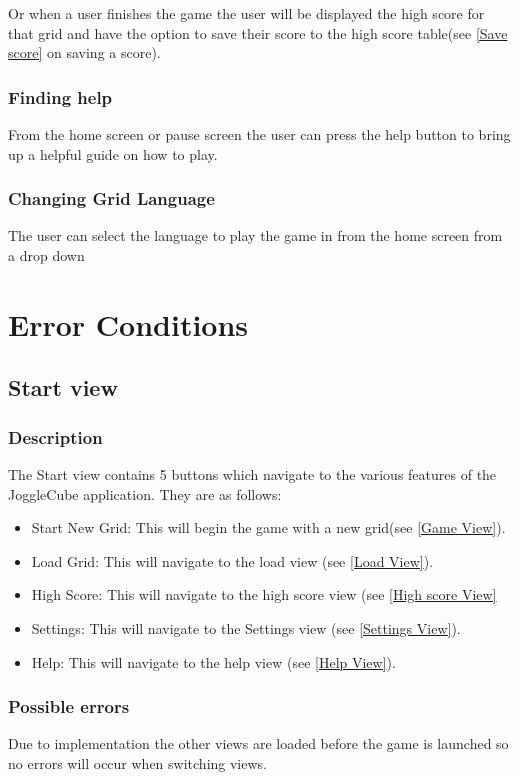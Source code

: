 \documentclass{project}
\begin{document}
		Or when a user finishes the game the user will be displayed the high score for that grid and have the option to save their score to the high score table(see \ref{Save score}  on saving a score).
		\subsubsection{Finding help} \label{Finding help}
			From the home screen or pause screen the user can press the help button to bring up a helpful guide on how to play.
		\subsubsection{Changing Grid Language}
			The user can select the language to play the game in from the home screen from a drop down
		
		
\section{Error Conditions}

\subsection{Start view} \label{Start View}
\subsubsection{Description}
The Start view contains 5 buttons which navigate to the various features of the JoggleCube application. They are as follows:
\begin{itemize}
\item[]Start New Grid: This will begin the game with a new grid(see \ref{Game View}).
\item[]Load Grid: This will navigate to the load view (see \ref{Load View}).
\item[]High Score: This will navigate to the high score view (see \ref{High score View}
\item[]Settings: This will navigate to the Settings view (see \ref{Settings View}).
\item[]Help: This will navigate to the help view (see \ref{Help View}).
\end{itemize} 
\subsubsection{Possible errors}
Due to implementation the other views are loaded before the game is launched so no errors will occur when switching views.
\end{document}

